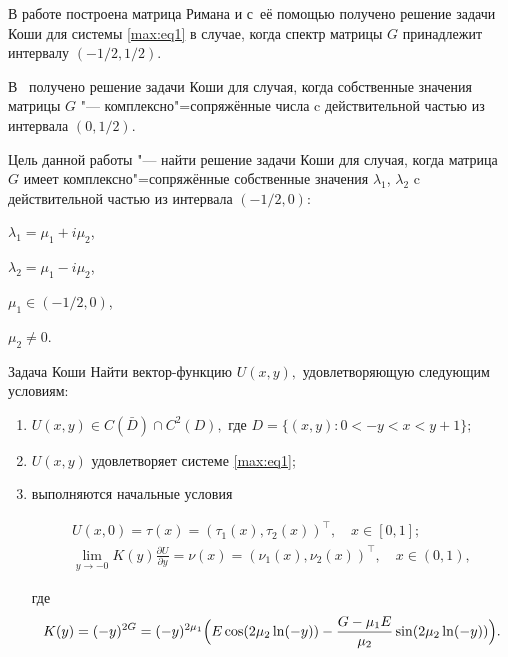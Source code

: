 В работе  \cite{mix:dis} построена матрица Римана и с~её помощью получено решение задачи Коши для системы \eqref{max:eq1} в случае, когда спектр матрицы $G$ принадлежит интервалу  $(-1/2, 1/2)$. 

В~\cite{mix:my} получено решение задачи Коши для случая, когда собственные значения матрицы $G$ "--- комплексно"=сопряжённые числа c действительной частью из интервала $(0, 1/2)$.



Цель данной работы "--- найти решение задачи Коши для случая, когда матрица $G$ имеет комплексно"=сопряжённые собственные значения $\lambda_1$, $\lambda_2$ c действительной частью из интервала $(-1/2, 0)$:

$\lambda_1=\mu_1+i \mu_2$, 

$\lambda_2=\mu_1-i \mu_2$, 

$\mu_1 \in (-1/2, 0)$,

$\mu_2 \neq 0$.





\begin{newthm}{Задача Коши} Найти вектор-функцию $U(x, y),$ удовлетворяющую следующим условиям\/{\rm:}

\begin{enumerate}

\item[\rm 1)] $U(x, y)\in C(\bar{D})\cap C^2(D),$ где $D=\{(x,y) : 0<-y<x<y+1\};$

\item[\rm 2)] $U(x, y)$ удовлетворяет системе \rm \eqref{max:eq1}; \it

\item[\rm 3)] выполняются начальные условия

\begin{gather}

  \label{max:kr1}

  U(x, 0)=\tau(x)=(\tau_1(x),\tau_2(x))^\top,\quad  x \in [0, 1];

\\

  \label{max:kr2}

  \lim_{y \to -0}K(y)\frac{\partial U}{\partial{y}}=\nu(x)=(\nu_1(x),\nu_2(x))^\top,\quad  x \in (0, 1),

\end{gather}

где $$\displaystyle K(y)=(-y)^{2G}=(-y)^{2\mu_1}\Bigl(E\cos(2\mu_2 \ln(-y))- \frac{G-\mu_1 E}{\mu_2} \sin(2\mu_2 \ln(-y))\Bigr).$$

\end{enumerate}



\end{newthm}



